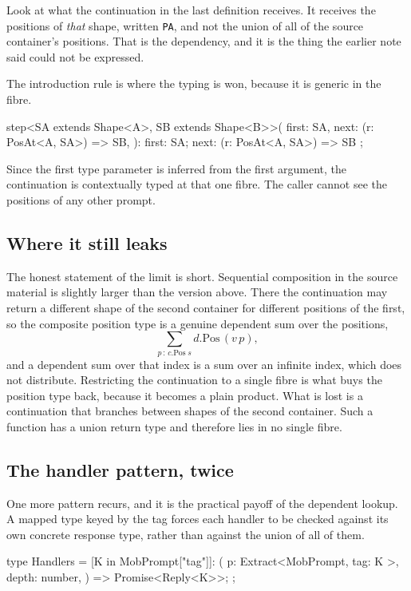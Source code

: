 \documentclass[11pt,a4paper]{article}
\begin{document}
Look at what the continuation in the last definition receives. It receives the
positions of \emph{that} shape, written \verb|PA|, and not the union of all of the
source container's positions. That is the dependency, and it is the thing the earlier
note said could not be expressed.

The introduction rule is where the typing is won, because it is generic in the fibre.

\begin{code}
step<SA extends Shape<A>, SB extends Shape<B>>(
  first: SA,
  next: (r: PosAt<A, SA>) => SB,
): { first: SA; next: (r: PosAt<A, SA>) => SB };
\end{code}

Since the first type parameter is inferred from the first argument, the continuation
is contextually typed at that one fibre. The caller cannot see the positions of any
other prompt.

\subsection{Where it still leaks}

The honest statement of the limit is short. Sequential composition in the source
material is slightly larger than the version above. There the continuation may return
a different shape of the second container for different positions of the first, so the
composite position type is a genuine dependent sum over the positions,
\[
  \sum_{p\, :\, c.\mathrm{Pos}\; s} d.\mathrm{Pos}\, (v\, p),
\]
and a dependent sum over that index is a sum over an infinite index, which does not
distribute. Restricting the continuation to a single fibre is what buys the position
type back, because it becomes a plain product. What is lost is a continuation that
branches between shapes of the second container. Such a function has a union return
type and therefore lies in no single fibre.

\subsection{The handler pattern, twice}

One more pattern recurs, and it is the practical payoff of the dependent lookup. A
mapped type keyed by the tag forces each handler to be checked against its own
concrete response type, rather than against the union of all of them.

\begin{code}
type Handlers = {
  [K in MobPrompt["tag"]]: (
    p: Extract<MobPrompt, { tag: K }>,
    depth: number,
  ) => Promise<Reply<K>>;
};
\end{code}
\end{document}
